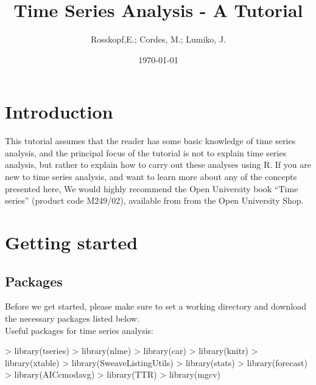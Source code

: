 \documentclass[11pt, a4paper]{article} %
\begin{document}

\title{Time Series Analysis - A Tutorial}
\author{Rosskopf,E.; Cordes, M.; Lumiko, J.}
\date{\today} %
\maketitle
{}
\tableofcontents
\pagebreak
\section{Introduction}%
This tutorial assumes that the reader has some basic knowledge of time series analysis, and the principal focus of the tutorial is not to explain time series analysis, but rather to explain how to carry out these analyses using R.
\noindent
If you are new to time series analysis, and want to learn more about any of the concepts presented here, We would highly recommend the Open University book “Time series” (product code M249/02), available from from the Open University Shop.
\section{Getting started}%
\subsection{Packages}
Before we get started, please make sure to set a working directory and download the necessary packages listed below.\\
\noindent Useful packages for time series analysis:
\begin{Schunk}
\begin{Sinput}
> library(tseries)
> library(nlme)
> library(car)
> library(knitr)
> library(xtable)
> library(SweaveListingUtils)
> library(stats)
> library(forecast)
> library(AICcmodavg)
> library(TTR)
> library(mgcv)
\end{Sinput}
\end{Schunk}
\end{document}
